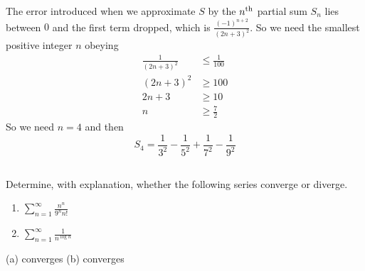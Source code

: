 \begin{solution}
The  error introduced when we approximate $S$ by the $n^{\rm th}$ partial
sum $S_n$ lies between $0$ and the first term dropped, which is
$\frac{(-1)^{n+2}}{(2n+3)^2}$.
So we need the smallest positive integer $n$ obeying
\begin{align*}
\frac{1}{(2n+3)^2} &\le\frac{1}{100}
\\ (2n+3)^2&\ge 100
\\ 2n+3&\ge 10
\\ n&\ge\frac{7}{2}
\end{align*}
So we need  $n=4$ and then
\begin{equation*}
   S_4= \frac{1}{3^2}-\frac{1}{5^2} +\frac{1}{7^2} -\frac{1}{9^2}
\end{equation*}

\end{solution}








\subsection*{\Application}

\begin{question}[M121 2014A]
Determine, with explanation, whether the following series converge or diverge.

\begin{enumerate}
\item[(a)] $\displaystyle\sum_{n=1}^\infty\frac{n^n}{9^n n!}$
\item[(b)] $\displaystyle\sum_{n=1}^\infty\frac{1}{n^{\log n}}$
\end{enumerate}
\end{question}


\begin{answer}
(a) converges
\qquad (b) converges
\end{answer}

